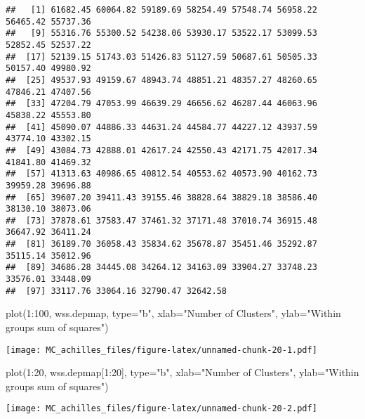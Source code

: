 \documentclass[
]{article}
\newenvironment{Shaded}{\begin{snugshade}}{\end{snugshade}}
\newcommand{\AttributeTok}[1]{\textcolor[rgb]{0.77,0.63,0.00}{#1}}
\newcommand{\DecValTok}[1]{\textcolor[rgb]{0.00,0.00,0.81}{#1}}
\newcommand{\FunctionTok}[1]{\textcolor[rgb]{0.00,0.00,0.00}{#1}}
\newcommand{\NormalTok}[1]{#1}
\newcommand{\OtherTok}[1]{\textcolor[rgb]{0.56,0.35,0.01}{#1}}
\newcommand{\SpecialCharTok}[1]{\textcolor[rgb]{0.00,0.00,0.00}{#1}}
\newcommand{\StringTok}[1]{\textcolor[rgb]{0.31,0.60,0.02}{#1}}
\begin{document}
\begin{verbatim}
##   [1] 61682.45 60064.82 59189.69 58254.49 57548.74 56958.22 56465.42 55737.36
##   [9] 55316.76 55300.52 54238.06 53930.17 53522.17 53099.53 52852.45 52537.22
##  [17] 52139.15 51743.03 51426.83 51127.59 50687.61 50505.33 50157.40 49980.92
##  [25] 49537.93 49159.67 48943.74 48851.21 48357.27 48260.65 47846.21 47407.56
##  [33] 47204.79 47053.99 46639.29 46656.62 46287.44 46063.96 45838.22 45553.80
##  [41] 45090.07 44886.33 44631.24 44584.77 44227.12 43937.59 43774.10 43302.15
##  [49] 43084.73 42888.01 42617.24 42550.43 42171.75 42017.34 41841.80 41469.32
##  [57] 41313.63 40986.65 40812.54 40553.62 40573.90 40162.73 39959.28 39696.88
##  [65] 39607.20 39411.43 39155.46 38828.64 38829.18 38586.40 38130.10 38073.06
##  [73] 37878.61 37583.47 37461.32 37171.48 37010.74 36915.48 36647.92 36411.24
##  [81] 36189.70 36058.43 35834.62 35678.87 35451.46 35292.87 35115.14 35012.96
##  [89] 34686.28 34445.08 34264.12 34163.09 33904.27 33748.23 33576.01 33448.09
##  [97] 33117.76 33064.16 32790.47 32642.58
\end{verbatim}

\begin{Shaded}
\begin{Highlighting}[]
\FunctionTok{plot}\NormalTok{(}\DecValTok{1}\SpecialCharTok{:}\DecValTok{100}\NormalTok{, wss.depmap, }\AttributeTok{type=}\StringTok{"b"}\NormalTok{, }\AttributeTok{xlab=}\StringTok{"Number of Clusters"}\NormalTok{,}
  \AttributeTok{ylab=}\StringTok{"Within groups sum of squares"}\NormalTok{)}
\end{Highlighting}
\end{Shaded}

\texttt{[image: MC\_achilles\_files/figure-latex/unnamed-chunk-20-1.pdf]}

\begin{Shaded}
\begin{Highlighting}[]
\FunctionTok{plot}\NormalTok{(}\DecValTok{1}\SpecialCharTok{:}\DecValTok{20}\NormalTok{, wss.depmap[}\DecValTok{1}\SpecialCharTok{:}\DecValTok{20}\NormalTok{], }\AttributeTok{type=}\StringTok{"b"}\NormalTok{, }\AttributeTok{xlab=}\StringTok{"Number of Clusters"}\NormalTok{,}
  \AttributeTok{ylab=}\StringTok{"Within groups sum of squares"}\NormalTok{)}
\end{Highlighting}
\end{Shaded}

\texttt{[image: MC\_achilles\_files/figure-latex/unnamed-chunk-20-2.pdf]}

\begin{Shaded}
\end{Shaded}
\end{document}
